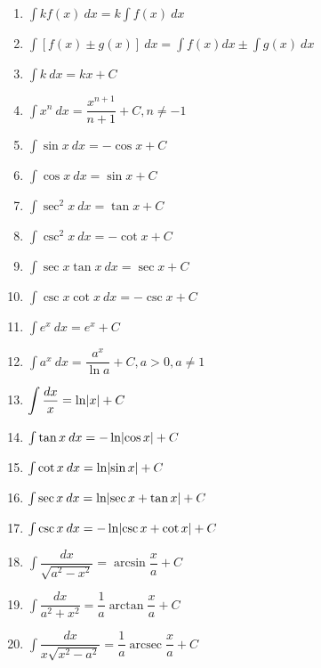 \documentclass[12pt,a4paper]{article}
\DeclareMathOperator{\arcsec}{arcsec}
\DeclarePairedDelimiter{\abs}{\lvert}{\rvert}
\begin{document}


\begin{enumerate}
  \item $\int kf(x) \: dx = k\int f(x) \: dx$
  \item $\int [f(x) \pm g(x)] \: dx = \int f(x)dx \pm \int g(x) \: dx$
  \item $\int k \: dx = kx + C$
  \item $\int x^n \: dx = \dfrac{x^{n+1}}{n+1} + C, n \neq -1$
  \item $\int \sin x \: dx = - \cos x + C$
  \item $\int \cos x \: dx = \sin x + C$
  \item $\int \sec^2 x \: dx = \tan x + C$
  \item $\int \csc^2 x \: dx = - \cot x + C$
  \item $\int \sec x \tan x \: dx = \sec x + C$
  \item $\int \csc x \cot x \: dx = - \csc x + C$
  \item $\int e^x \: dx = e^x + C$
  \item $\int a^x \: dx = \dfrac{a^x}{\ln a} + C, a > 0, a \neq 1$
  \item $\displaystyle \int \dfrac{dx}{x} = \ln \abs{x} + C$
  \item $\int \tan x \: dx = - \ln \abs{\cos x} + C$
  \item $\int \cot x \: dx = \ln \abs{\sin x} + C$
  \item $\int \sec x \: dx = \ln \abs{\sec x + \tan x} + C$
  \item $\int \csc x \: dx = -\ln \abs{\csc x + \cot x} + C$
  \item $\displaystyle \int \dfrac{dx}{\sqrt{a^2 - x^2}} = \arcsin \dfrac{x}{a} + C$
  \item $\displaystyle \int \dfrac{dx}{a^2 + x^2} = \dfrac{1}{a} \arctan \dfrac{x}{a} + C$
  \item $\displaystyle \int \dfrac{dx}{x \sqrt{x^2 - a^2}} = \dfrac{1}{a} \arcsec \dfrac{x}{a} + C$
\end{enumerate}
\end{document}
